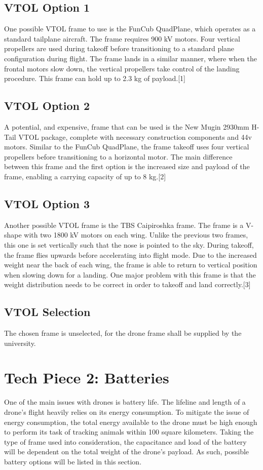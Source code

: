 \documentclass[onecolumn, draftclsnofoot,10pt, compsoc]{IEEEtran}
\begin{document}
\subsection{VTOL Option 1}
One possible VTOL frame to use is the FunCub QuadPlane, which operates as a standard tailplane aircraft. The frame requires 900 kV motors. Four vertical propellers are used during takeoff before transitioning to a standard plane configuration during flight. The frame lands in a similar manner, where when the frontal motors slow down, the vertical propellers take control of the landing procedure. This frame can hold up to 2.3 kg of payload.[1]
\subsection{VTOL Option 2}
A potential, and expensive, frame that can be used is the New Mugin 2930mm H-Tail VTOL package, complete with necessary construction components and 44v motors. Similar to the FunCub QuadPlane, the frame takeoff uses four vertical propellers before transitioning to a horizontal motor. The main difference between this frame and the first option is the increased size and payload of the frame, enabling a carrying capacity of up to 8 kg.[2]
\subsection{VTOL Option 3}
Another possible VTOL frame is the TBS Caipiroshka frame. The frame is a V-shape with two 1800 kV motors on each wing. Unlike the previous two frames, this one is set vertically such that the nose is pointed to the sky. During takeoff, the frame flies upwards before accelerating into flight mode. Due to the increased weight near the back of each wing, the frame is able to return to vertical position when slowing down for a landing. One major problem with this frame is that the weight distribution needs to be correct in order to takeoff and land correctly.[3]
\subsection{VTOL Selection}
The chosen frame is unselected, for the drone frame shall be supplied by the university.

\section{Tech Piece 2: Batteries}
One of the main issues with drones is battery life. The lifeline and length of a drone's flight heavily relies on its energy consumption. To mitigate the issue of energy consumption, the total energy available to the drone must be high enough to perform its task of tracking animals within 100 square kilometers. Taking the type of frame used into consideration, the capacitance and load of the battery will be dependent on the total weight of the drone's payload. As such, possible battery options will be listed in this section.
\end{document}
